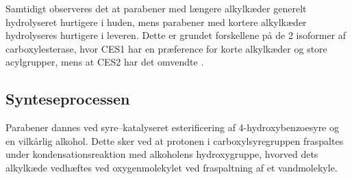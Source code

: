     Samtidigt observeres det at parabener med længere alkylkæder generelt hydrolyseret hurtigere i huden, mens parabener med kortere alkylkæder hydrolyseres hurtigere i leveren. Dette er grundet forskellene på de 2 isoformer af carboxylesterase, hvor CES1 har en præference for korte alkylkæder og store acylgrupper, mens at CES2 har det omvendte \parencite{Cath2021}.

    \subsection{Synteseprocessen}
    Parabener dannes ved syre--katalyseret esterificering af 4-hydroxybenzoesyre og en vilkårlig alkohol. Dette sker ved at protonen i carboxylsyregruppen fraspaltes under kondensationsreaktion med alkoholens hydroxygruppe, hvorved dets alkylkæde vedhæftes ved oxygenmolekylet ved fraspaltning af et vandmolekyle.

